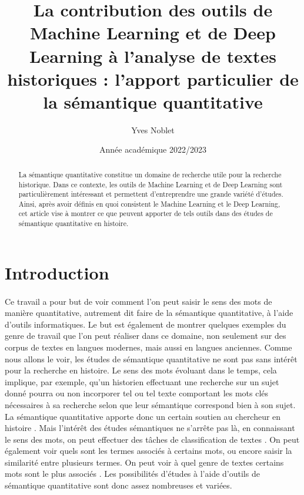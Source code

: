 \documentclass{article}
\title{La contribution des outils de Machine Learning et de Deep Learning à l’analyse de textes historiques : l'apport particulier de la sémantique quantitative}
\author{Yves Noblet}
\date{Année académique 2022/2023}
\begin{document}
\maketitle
\begin{abstract}
    La sémantique quantitative constitue un domaine de recherche utile pour la recherche historique. Dans ce contexte, les outils de Machine Learning et de Deep Learning sont particulièrement intéressant et permettent d'entreprendre une grande variété d'études. Ainsi, après avoir définis en quoi consistent le Machine Learning et le Deep Learning, cet article vise à montrer ce que peuvent apporter de tels outils dans des études de sémantique quantitative en histoire. 
\end{abstract}
\section{Introduction}
\paragraph{}
Ce travail a pour but de voir comment l’on peut saisir le sens des mots de manière quantitative, autrement dit faire de la sémantique quantitative, à l’aide d’outils informatiques. Le but est également de montrer quelques exemples du genre de travail que l’on peut réaliser dans ce domaine, non seulement sur des corpus de textes en langues modernes, mais aussi en langues anciennes. Comme nous allons le voir, les études de sémantique quantitative ne sont pas sans intérêt pour la recherche en histoire. Le sens des mots évoluant dans le temps, cela implique, par exemple, qu’un historien effectuant une recherche sur un sujet donné pourra ou non incorporer tel ou tel texte comportant les mots clés nécessaires à sa recherche selon que leur sémantique correspond bien à son sujet. La sémantique quantitative apporte donc un certain soutien au chercheur en histoire \cite{liebeskind2020deep}. Mais l’intérêt des études sémantiques ne s’arrête pas là, en connaissant le sens des mots, on peut effectuer des tâches de classification de textes \cite{liebeskind2020deep}. On peut également voir quels sont les termes associés à certains mots, ou encore saisir la similarité entre plusieurs termes. On peut voir à quel genre de textes certains mots sont le plus associés \cite{perrone2019gasc}. Les possibilités d’études à l’aide d’outils de sémantique quantitative sont donc assez nombreuses et variées. 
\end{document}
